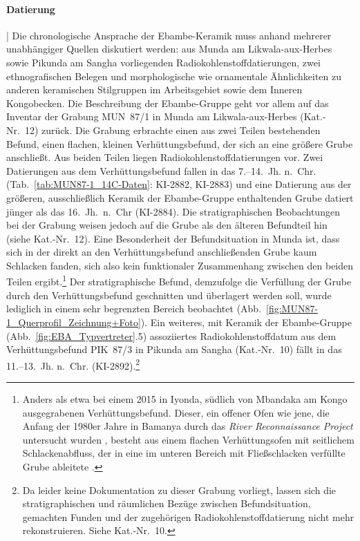 \paragraph{Datierung}\hspace{-.5em}|\hspace{.5em}%
Die chronologische Ansprache der Ebambe-Keramik muss anhand mehrerer unabhängiger Quellen diskutiert werden: aus Munda am \mbox{Likwala}-\mbox{aux}-\mbox{Herbes} sowie Pikunda am \mbox{Sangha} vorliegenden Radiokohlenstoffdatierungen, zwei ethnografischen Belegen und morphologische wie ornamentale Ähnlichkeiten zu anderen keramischen Stilgruppen im Arbeitsgebiet sowie dem Inneren Kongobecken. Die Beschreibung der Ebambe-Gruppe geht vor allem auf das Inventar der Grabung MUN~87/1 in Munda am \mbox{Likwala}-\mbox{aux}-\mbox{Herbes} (Kat.-Nr.~12) zurück. Die Grabung erbrachte einen aus zwei Teilen bestehenden Befund, einen flachen, kleinen Verhüttungsbefund, der sich an eine größere Grube anschließt. Aus beiden Teilen liegen Radiokohlenstoffdatierungen vor. Zwei Datierungen aus dem Verhüttungsbefund fallen in das 7.--14.~Jh. n.~Chr. (Tab.~\ref{tab:MUN87-1_14C-Daten}: KI-2882, KI-2883) und eine Datierung aus der größeren, ausschließlich Keramik der Ebambe-Gruppe enthaltenden Grube datiert jünger als das 16.~Jh.~n.~Chr (KI-2884). Die stratigraphischen Beobachtungen bei der Grabung weisen jedoch auf die Grube als den älteren Befundteil hin (siehe Kat.-Nr.~12). Eine Besonderheit der Befundsituation in Munda ist, dass sich in der direkt an den Verhüttungsbefund anschließenden Grube kaum Schlacken fanden, sich also kein funktionaler Zusammenhang zwischen den beiden Teilen ergibt.\footnote{Anders als etwa bei einem 2015 in Iyonda, südlich von Mbandaka am Kongo ausgegrabenen Verhüttungsbefund. Dieser, ein offener Ofen wie jene, die Anfang der 1980er Jahre in Bamanya durch das \textit{River Reconnaissance Project} untersucht wurden \parencite[3235--3237]{Eggert.1987}, besteht aus einem flachen Verhüttungsofen mit seitlichem Schlackenabfluss, der in eine im unteren Bereich mit Fließschlacken verfüllte Grube ableitete \parencite{Jungnickel.2016}.} Der stratigraphische Befund, demzufolge die Verfüllung der Grube durch den Verhüttungsbefund geschnitten und überlagert werden soll, wurde lediglich in einem sehr begrenzten Bereich beobachtet (Abb.~\ref{fig:MUN87-1_Querprofil_Zeichnung+Foto}). Ein weiteres, mit Keramik der Ebambe-Gruppe (Abb.~\ref{fig:EBA_Typvertreter}.5) assoziiertes Radiokohlenstoffdatum aus dem Verhüttungsbefund PIK~87/3 in Pikunda am \mbox{Sangha} (Kat.-Nr.~10) fällt in das 11.--13.~Jh. n.~Chr. (KI-2892).\footnote{Da leider keine Dokumentation zu dieser Grabung vorliegt, lassen sich die stratigraphischen und räumlichen Bezüge zwischen Befundsituation, gemachten Funden und der zugehörigen Radiokohlenstoffdatierung nicht mehr rekonstruieren. Siehe Kat.-Nr.~10.}

